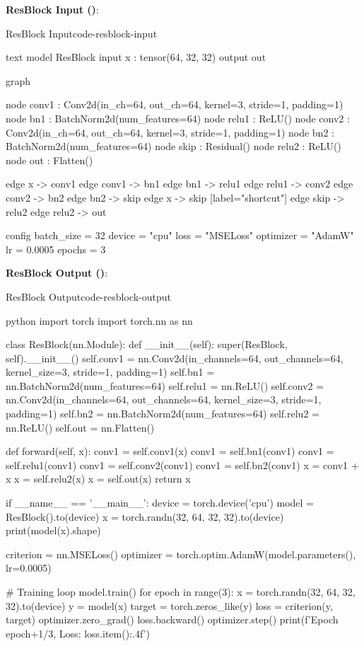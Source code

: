 \documentclass{nngraph-en}
\begin{document}
\textbf{ResBlock Input ()}:
\begin{codebox}{ResBlock Input}{code-resblock-input}
\begin{amzcode}[fontsize=\scriptsize]{text}
model ResBlock {
    input x : tensor(64, 32, 32)
    output out
}

graph {
    node conv1 : Conv2d(in_ch=64, out_ch=64, kernel=3, stride=1, padding=1)
    node bn1   : BatchNorm2d(num_features=64)
    node relu1 : ReLU()
    node conv2 : Conv2d(in_ch=64, out_ch=64, kernel=3, stride=1, padding=1)
    node bn2   : BatchNorm2d(num_features=64)
    node skip  : Residual()
    node relu2 : ReLU()
    node out   : Flatten()

    edge x -> conv1
    edge conv1 -> bn1
    edge bn1 -> relu1
    edge relu1 -> conv2
    edge conv2 -> bn2
    edge bn2 -> skip
    edge x -> skip [label="shortcut"]
    edge skip -> relu2
    edge relu2 -> out
}

config {
    batch_size = 32
    device = "cpu"
    loss = "MSELoss"
    optimizer = "AdamW"
    lr = 0.0005
    epochs = 3
}
\end{amzcode}
\end{codebox}

\textbf{ResBlock Output ()}:
\begin{codebox}{ResBlock Output}{code-resblock-output}
\begin{amzcode}[fontsize=\scriptsize]{python}
import torch
import torch.nn as nn

class ResBlock(nn.Module):
    def __init__(self):
        super(ResBlock, self).__init__()
        self.conv1 = nn.Conv2d(in_channels=64, out_channels=64, kernel_size=3, stride=1, padding=1)
        self.bn1 = nn.BatchNorm2d(num_features=64)
        self.relu1 = nn.ReLU()
        self.conv2 = nn.Conv2d(in_channels=64, out_channels=64, kernel_size=3, stride=1, padding=1)
        self.bn2 = nn.BatchNorm2d(num_features=64)
        self.relu2 = nn.ReLU()
        self.out = nn.Flatten()

    def forward(self, x):
        conv1 = self.conv1(x)
        conv1 = self.bn1(conv1)
        conv1 = self.relu1(conv1)
        conv1 = self.conv2(conv1)
        conv1 = self.bn2(conv1)
        x = conv1 + x
        x = self.relu2(x)
        x = self.out(x)
        return x

if __name__ == '__main__':
    device = torch.device('cpu')
    model = ResBlock().to(device)
    x = torch.randn(32, 64, 32, 32).to(device)
    print(model(x).shape)

    criterion = nn.MSELoss()
    optimizer = torch.optim.AdamW(model.parameters(), lr=0.0005)

    # Training loop
    model.train()
    for epoch in range(3):
        x = torch.randn(32, 64, 32, 32).to(device)
        y = model(x)
        target = torch.zeros_like(y)
        loss = criterion(y, target)
        optimizer.zero_grad()
        loss.backward()
        optimizer.step()
        print(f'Epoch {epoch+1}/3, Loss: {loss.item():.4f}')
\end{amzcode}
\end{codebox}
\end{document}
